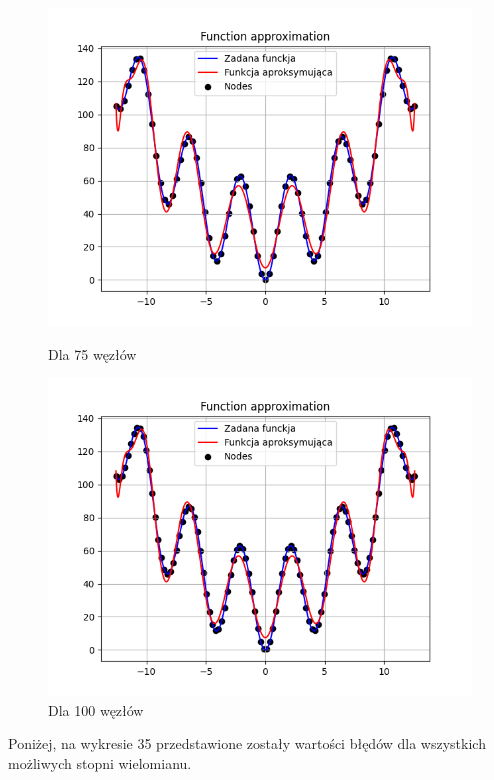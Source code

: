 \documentclass{article}
\begin{document}
\begin{figure}[H]
\begin{minipage}[b]{0.49\textwidth}
    \begin{minipage}[b]{\textwidth}
      \includegraphics[width=\textwidth]{img35.png}
      \caption{Dla 75 węzłów}
    \end{minipage}
    \vspace*{\fill}
    \begin{minipage}[b]{\textwidth}
      \includegraphics[width=\textwidth]{img36.png}
      \caption{Dla 100 węzłów}
    \end{minipage}
  \end{minipage}
\end{figure}

Poniżej, na wykresie 35 przedstawione zostały wartości błędów dla wszystkich możliwych stopni wielomianu.
\end{document}
